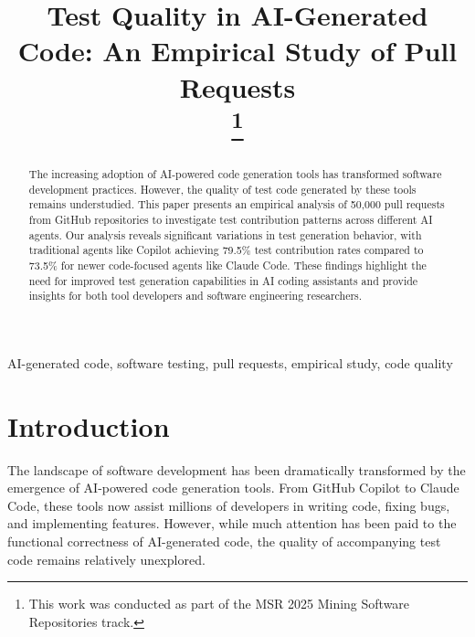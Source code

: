 \documentclass[conference]{IEEEtran}
\begin{document}
\title{Test Quality in AI-Generated Code: An Empirical Study of Pull Requests\\
\thanks{This work was conducted as part of the MSR 2025 Mining Software Repositories track.}
}

\author{
}

\maketitle

\begin{abstract}
The increasing adoption of AI-powered code generation tools has transformed software development practices. However, the quality of test code generated by these tools remains understudied. This paper presents an empirical analysis of 50,000 pull requests from GitHub repositories to investigate test contribution patterns across different AI agents. Our analysis reveals significant variations in test generation behavior, with traditional agents like Copilot achieving 79.5\% test contribution rates compared to 73.5\% for newer code-focused agents like Claude Code. These findings highlight the need for improved test generation capabilities in AI coding assistants and provide insights for both tool developers and software engineering researchers.
\end{abstract}

\begin{IEEEkeywords}
AI-generated code, software testing, pull requests, empirical study, code quality
\end{IEEEkeywords}

\section{Introduction}

The landscape of software development has been dramatically transformed by the emergence of AI-powered code generation tools. From GitHub Copilot to Claude Code, these tools now assist millions of developers in writing code, fixing bugs, and implementing features. However, while much attention has been paid to the functional correctness of AI-generated code, the quality of accompanying test code remains relatively unexplored.
\end{document}
